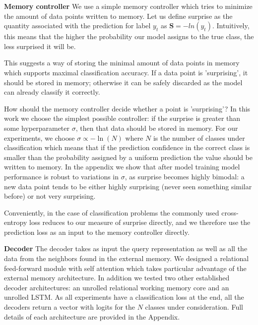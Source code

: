\documentclass{article} \usepackage{iclr2019_conference,times}
\begin{document}
\textbf{Memory controller} We use a simple memory controller which tries to minimize the amount of data points written to memory. Let us define surprise as the quantity associated with the prediction for label $y_t$ as $\mathbf{S} = -ln(y_t)$. Intuitively, this means that the higher the probability our model assigns to the true class, the less surprised it will be.

This suggests a way of storing the minimal amount of data points in memory which supports maximal classification accuracy. If a data point is 'surprising', it should be stored in memory; otherwise it can be safely discarded as the model can already classify it correctly.

How should the memory controller decide whether a point is 'surprising'? In this work we choose the simplest possible controller: if the surprise is greater than some hyperparameter $\sigma$, then that data should be stored in memory. For our experiments, we choose $\sigma \propto -\ln(N)$ where $N$ is the number of classes under classification which means that if the prediction confidence in the correct class is smaller than the probability assigned by a uniform prediction the value should be written to memory. In the appendix we show that after model training model performance is robust to variations in $\sigma$, as surprise becomes highly bimodal: a new data point tends to be either highly surprising (never seen something similar before) or not very surprising.

Conveniently, in the case of classification problems the commonly used cross-entropy loss reduces to our measure of surprise directly, and we therefore use the prediction loss as an input to the memory controller directly.

\textbf{Decoder} The decoder takes as input the query representation as well as all the data from the neighbors found in the external memory. We designed a relational feed-forward module with self attention which takes particular advantage of the external memory architecture. In addition we tested two other established decoder architectures: an unrolled relational working memory core and an unrolled LSTM. As all experiments have a classification loss at the end, all the decoders return a vector with logits for the $N$ classes under consideration. Full details of each architecture are provided in the Appendix.
\end{document}
